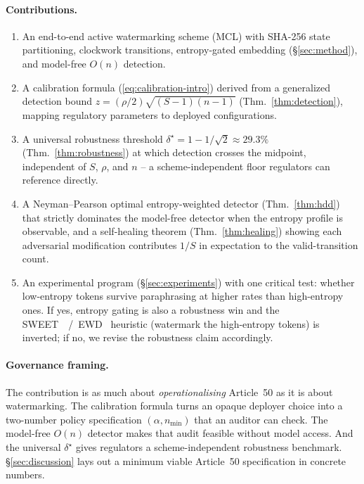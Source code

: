 \paragraph{Contributions.}
\begin{enumerate}[nosep, leftmargin=*]
  \item An end-to-end active watermarking scheme (MCL) with
    SHA-256 state partitioning, clockwork transitions, entropy-gated
    embedding (\S\ref{sec:method}), and model-free $O(n)$ detection.
  \item A calibration formula (\cref{eq:calibration-intro}) derived
    from a generalized detection bound $z = (\rho/2)\sqrt{(S-1)(n-1)}$
    (Thm.~\ref{thm:detection}), mapping regulatory parameters to
    deployed configurations.
  \item A universal robustness threshold
    $\delta^\star = 1 - 1/\sqrt{2} \approx 29.3\%$
    (Thm.~\ref{thm:robustness}) at which detection crosses the
    midpoint, independent of $S$, $\rho$, and $n$ -- a
    scheme-independent floor regulators can reference directly.
  \item A Neyman--Pearson optimal entropy-weighted detector
    (Thm.~\ref{thm:hdd}) that strictly dominates the model-free
    detector when the entropy profile is observable, and a
    self-healing theorem (Thm.~\ref{thm:healing}) showing each
    adversarial modification contributes $1/S$ in expectation to the
    valid-transition count.
  \item An experimental program (\S\ref{sec:experiments}) with one
    critical test: whether low-entropy tokens survive paraphrasing at
    higher rates than high-entropy ones.
    If yes, entropy gating is also a robustness win and the
    SWEET~\citep{lee2023sweet}~/~EWD~\citep{lu2024ewd} heuristic
    (watermark the high-entropy tokens) is inverted; if no, we revise
    the robustness claim accordingly.
\end{enumerate}

\paragraph{Governance framing.}
The contribution is as much about \emph{operationalising} Article~50
as it is about watermarking. The calibration formula turns an opaque
deployer choice into a two-number policy specification
$(\alpha, n_{\min})$ that an auditor can check. The model-free
$O(n)$ detector makes that audit feasible without model access. And
the universal $\delta^\star$ gives regulators a scheme-independent
robustness benchmark. \S\ref{sec:discussion} lays out a minimum viable
Article~50 specification in concrete numbers.
